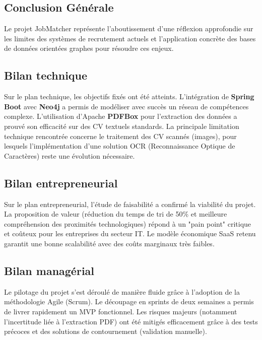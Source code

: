 \documentclass[12pt,a4paper]{report}
\begin{document}
\begin{itemize}
\chapter*{Conclusion Générale}

Le projet JobMatcher représente l'aboutissement d'une réflexion approfondie sur les limites des systèmes de recrutement actuels et l'application concrète des bases de données orientées graphes pour résoudre ces enjeux.

\section*{Bilan technique}
Sur le plan technique, les objectifs fixés ont été atteints. L'intégration de \textbf{Spring Boot} avec \textbf{Neo4j} a permis de modéliser avec succès un réseau de compétences complexe. L'utilisation d'Apache \textbf{PDFBox} pour l'extraction des données a prouvé son efficacité sur des CV textuels standards. La principale limitation technique rencontrée concerne le traitement des CV scannés (images), pour lesquels l'implémentation d'une solution OCR (Reconnaissance Optique de Caractères) reste une évolution nécessaire.

\section*{Bilan entrepreneurial}
Sur le plan entrepreneurial, l'étude de faisabilité a confirmé la viabilité du projet. La proposition de valeur (réduction du temps de tri de 50\% et meilleure compréhension des proximités technologiques) répond à un "pain point" critique et coûteux pour les entreprises du secteur IT. Le modèle économique SaaS retenu garantit une bonne scalabilité avec des coûts marginaux très faibles.

\section*{Bilan managérial}
Le pilotage du projet s'est déroulé de manière fluide grâce à l'adoption de la méthodologie Agile (Scrum). Le découpage en sprints de deux semaines a permis de livrer rapidement un MVP fonctionnel. Les risques majeurs (notamment l'incertitude liée à l'extraction PDF) ont été mitigés efficacement grâce à des tests précoces et des solutions de contournement (validation manuelle).


\end{itemize}
\end{document}
